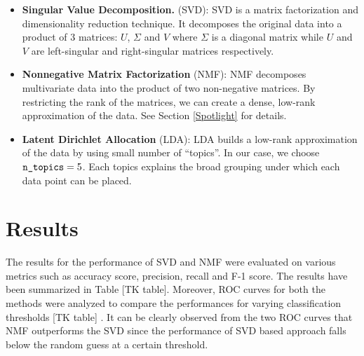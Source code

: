 \documentclass{article} %
\begin{document}
\begin{itemize}

    \item \textbf{Singular Value Decomposition.} (SVD): SVD is a matrix factorization and dimensionality reduction technique. It decomposes the original data into a product of 3 matrices: $U$, $\Sigma$ and $V$ where $\Sigma$ is a diagonal matrix while $U$ and $V$ are left-singular and right-singular matrices respectively.

    \item \textbf{Nonnegative Matrix Factorization} (NMF): NMF decomposes multivariate data into the product of two non-negative matrices. By restricting the rank of the matrices, we can create a dense, low-rank approximation of the data. See Section \ref{Spotlight} for details.

    \item \textbf{Latent Dirichlet Allocation} (LDA): LDA builds a low-rank approximation of the data by using small number of ``topics''. In our case, we choose $\texttt{\detokenize{n_topics}}=5$. Each topics explains the broad grouping under which each data point can  be placed.

\end{itemize}

\section{Results}

The results for the performance of SVD and NMF were evaluated on various metrics such as accuracy score, precision, recall and F-1 score. The results have been summarized in Table [TK table]. Moreover, ROC curves for both the methods were analyzed to compare the performances for varying classification thresholds [TK table] . It can be clearly observed from the two ROC curves that NMF outperforms the SVD since the performance of SVD based approach falls below the random guess at a certain threshold.
\end{document}
